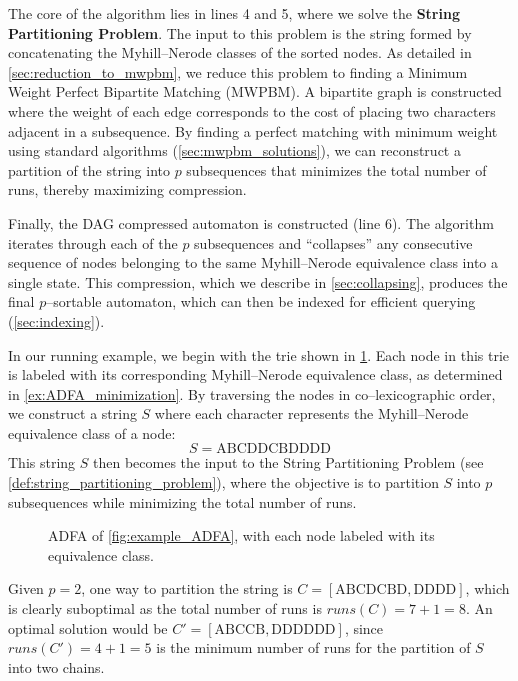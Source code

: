 The core of the algorithm lies in lines 4 and 5, where we solve the \textbf{String Partitioning Problem}. The input to this problem is the string formed by concatenating the Myhill--Nerode classes of the sorted nodes. As detailed in \cref{sec:reduction_to_mwpbm}, we reduce this problem to finding a Minimum Weight Perfect Bipartite Matching (MWPBM). A bipartite graph is constructed where the weight of each edge corresponds to the cost of placing two characters adjacent in a subsequence. By finding a perfect matching with minimum weight using standard algorithms (\cref{sec:mwpbm_solutions}), we can reconstruct a partition of the string into $p$ subsequences that minimizes the total number of runs, thereby maximizing compression.

Finally, the DAG compressed automaton is constructed (line 6). The algorithm iterates through each of the $p$ subsequences and ``collapses'' any consecutive sequence of nodes belonging to the same Myhill--Nerode equivalence class into a single state. This compression, which we describe in \cref{sec:collapsing}, produces the final $p$--sortable automaton, which can then be indexed for efficient querying (\cref{sec:indexing}).

\begin{example} \label{ex:string_example}
    In our running example, we begin with the trie shown in \cref{fig:mn-compressed-tree}. Each node in this trie is labeled with its corresponding Myhill--Nerode equivalence class, as determined in \cref{ex:ADFA_minimization}. By traversing the nodes in co--lexicographic order, we construct a string $S$ where each character represents the Myhill--Nerode equivalence class of a node:
    \[
        S = \text{ABCDDCBDDDD}
    \]
    This string $S$ then becomes the input to the String Partitioning Problem (see \cref{def:string_partitioning_problem}), where the objective is to partition $S$ into $p$ subsequences while minimizing the total number of runs.

    \begin{figure}[H]
        \centering
        
        \caption{ADFA of \cref{fig:example_ADFA}, with each node labeled with its equivalence class.}
        \label{fig:mn-compressed-tree}
    \end{figure}

    Given $p = 2$, one way to partition the string is $C = [\text{ABCDCBD}, \text{DDDD}]$, which is clearly suboptimal as the total number of runs is $runs(C) = 7 + 1 = 8$.
    An optimal solution would be $C' = [\text{ABCCB}, \text{DDDDDD}]$, since $runs(C') = 4 + 1 = 5$ is the minimum number of runs for the partition of $S$ into two chains.
    
\end{example}